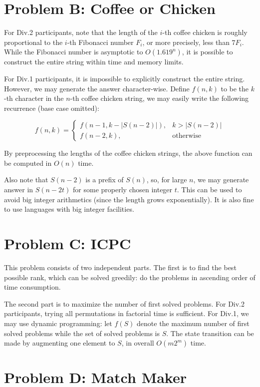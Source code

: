 \documentclass[a4paper,10.5pt,twoside]{article}
\begin{document}
\section*{Problem B: Coffee or Chicken}
For Div.2 participants, note that the length of the $i$-th coffee chicken is roughly proportional to the $i$-th Fibonacci number $F_i$, or more precisely, less than $7F_i$. While the Fibonacci number is asymptotic to $O(1.619^n)$, it is possible to construct the entire string within time and memory limits.

For Div.1 participants, it is impossible to explicitly construct the entire string. However, we may generate the answer character-wise. Define $f(n, k)$ to be the $k$-th character in the $n$-th coffee chicken string, we may easily write the following recurrence (base case omitted):

$$
f(n, k) = \begin{cases}
	f(n-1, k-|S(n-2)|), & k > |S(n-2)| \\
	f(n-2, k), & \text{otherwise}
\end{cases}
$$

By preprocessing the lengths of the coffee chicken strings, the above function can be computed in $O(n)$ time.

Also note that $S(n-2)$ is a prefix of $S(n)$, so, for large $n$, we may generate answer in $S(n-2t)$ for some properly chosen integer $t$. This can be used to avoid big integer arithmetics (since the length grows exponentially). It is also fine to use languages with big integer facilities.

\section*{Problem C: ICPC}

This problem consists of two independent parts. The first is to find the best possible rank, which can be solved greedily: do the problems in ascending order of time consumption.

The second part is to maximize the number of first solved problems. For Div.2 participants, trying all permutations in factorial time is sufficient. For Div.1, we may use dynamic programming: let $f(S)$ denote the maximum number of first solved problems while the set of solved problems is $S$. The state transition can be made by augmenting one element to $S$, in overall $O(m 2^m)$ time.

\section*{Problem D: Match Maker}
\end{document}
